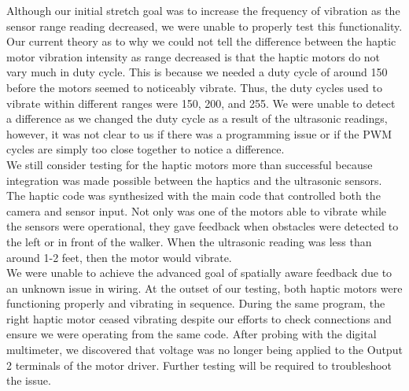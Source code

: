 \noindent Although our initial stretch goal was to increase the frequency of vibration as the sensor range reading decreased, we were unable to properly test this functionality. Our current theory as to why we could not tell the difference between the haptic motor vibration intensity as range decreased is that the haptic motors do not vary much in duty cycle. This is because we needed a duty cycle of around 150 before the motors seemed to noticeably vibrate. Thus, the duty cycles used to vibrate within different ranges were 150, 200, and 255. We were unable to detect a difference as we changed the duty cycle as a result of the ultrasonic readings, however, it was not clear to us if there was a programming issue or if the PWM cycles are simply too close together to notice a difference.\\

\noindent We still consider testing for the haptic motors more than successful because integration was made possible between the haptics and the ultrasonic sensors. The haptic code was synthesized with the main code that controlled both the camera and sensor input. Not only was one of the motors able to vibrate while the sensors were operational, they gave feedback when obstacles were detected to the left or in front of the walker. When the ultrasonic reading was less than around 1-2 feet, then the motor would vibrate.\\

\noindent We were unable to achieve the advanced goal of spatially aware feedback due to an unknown issue in wiring. At the outset of our testing, both haptic motors were functioning properly and vibrating in sequence. During the same program, the right haptic motor ceased vibrating despite our efforts to check connections and ensure we were operating from the same code. After probing with the digital multimeter, we discovered that voltage was no longer being applied to the Output 2 terminals of the motor driver. Further testing will be required to troubleshoot the issue.\\